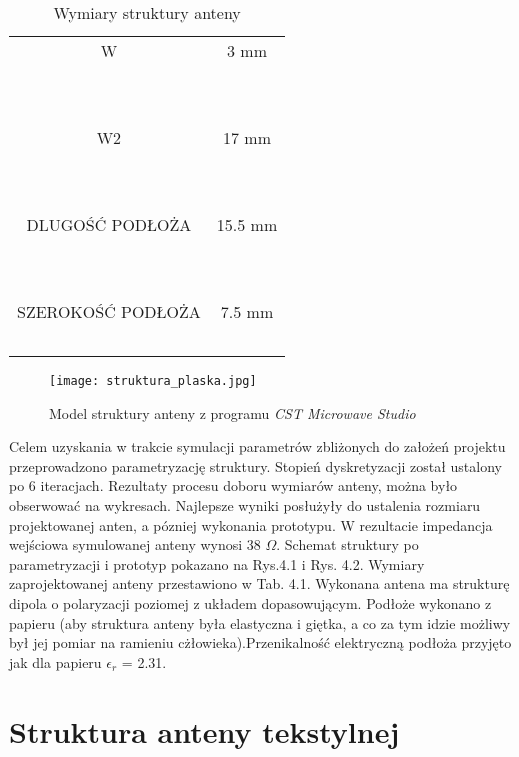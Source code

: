 \begin{table}[h]
\begin{center}
\begin{tabular}{|c|c|}
    W                 & 3 mm    \\
    ~                 & ~       \\ \hline
    ~                 & ~       \\
    W2                & 17 mm   \\
    ~                 & ~       \\ \hline
    ~                 & ~       \\
    DLUGOŚĆ PODŁOŻA   & 15.5 mm \\
    ~                 & ~       \\ \hline
    ~                 & ~       \\
    SZEROKOŚĆ PODŁOŻA & 7.5 mm  \\
    ~                 & ~       \\ \hline
    \end{tabular}
	\caption{Wymiary struktury anteny}
\end{center}
\end{table}



\begin{figure}[h!]
	\centering
	    \texttt{[image: struktura\_plaska.jpg]}
	    \caption{Model struktury anteny z programu \emph{CST Microwave Studio}}
\end{figure}


Celem uzyskania w trakcie symulacji parametrów zbliżonych do założeń projektu przeprowadzono parametryzację struktury. Stopień dyskretyzacji został ustalony po 6 iteracjach. Rezultaty procesu doboru wymiarów anteny, można było obserwować na wykresach. Najlepsze wyniki posłużyły do ustalenia rozmiaru projektowanej anten, a pózniej wykonania prototypu. W rezultacie impedancja wejściowa symulowanej anteny wynosi 38 \(\Omega\). Schemat struktury po parametryzacji i prototyp pokazano na Rys.4.1 i Rys. 4.2. Wymiary zaprojektowanej anteny przestawiono w Tab. 4.1. 
\noindent 
\newline Wykonana antena ma strukturę dipola o polaryzacji poziomej z układem dopasowującym. 
Podłoże wykonano z papieru (aby struktura anteny była elastyczna i giętka, a co za tym idzie możliwy był jej pomiar na ramieniu cżłowieka).Przenikalność elektryczną podłoża przyjęto jak dla papieru $\epsilon_{r}$ = 2.31.

\noindent
\newline
\newline
\section{Struktura anteny tekstylnej}

